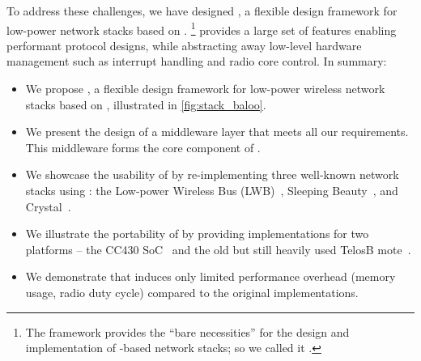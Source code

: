 To address these challenges, we have designed \baloo, a flexible design framework for low-power network stacks based on \ST.%
\footnote{The framework provides the ``bare necessities'' for the design and implementation of \ST-based network stacks; so we called it \baloo.}
\baloo provides a large set of features enabling performant protocol designs, while abstracting away low-level hardware management such as interrupt handling and radio core control.
In summary:

\begin{itemize}
	\item
	We propose \baloo, a flexible design framework for low-power wireless network stacks based on \ST, illustrated in \cref{fig:stack_baloo}.

	\item
	We present the design of a middleware layer that meets all our requirements. This middleware forms the core component of \baloo.

	\item
	We showcase the usability of \baloo by re-implementing three well-known network stacks using \ST: the Low-power Wireless Bus (LWB)~\cite{ferrari2012LWB}, Sleeping Beauty~\cite{sarkar2016Sleeping}, and Crystal~\cite{istomin2018Interferenceresilient}.

	\item
	We illustrate the portability of \baloo by providing implementations for two platforms -- the CC430 SoC~\cite{CC430F6137} and the old but still heavily used TelosB mote~\cite{TelosB}.

	\item
	We demonstrate that \baloo induces only limited performance overhead (memory usage, radio duty cycle) compared to the original implementations.

\end{itemize}


